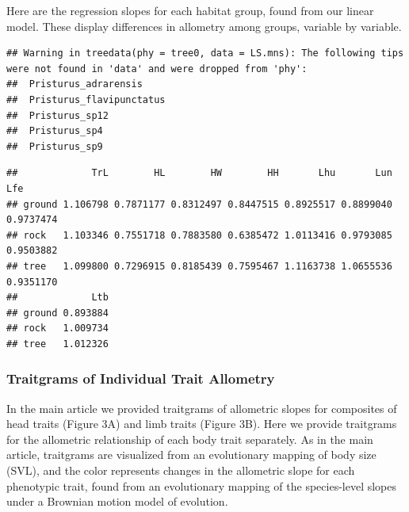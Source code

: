 \documentclass[
  11pt,
]{article}
\newenvironment{Shaded}{\begin{snugshade}}{\end{snugshade}}
\newcommand{\AttributeTok}[1]{\textcolor[rgb]{0.77,0.63,0.00}{#1}}
\newcommand{\CommentTok}[1]{\textcolor[rgb]{0.56,0.35,0.01}{\textit{#1}}}
\newcommand{\DecValTok}[1]{\textcolor[rgb]{0.00,0.00,0.81}{#1}}
\newcommand{\FunctionTok}[1]{\textcolor[rgb]{0.00,0.00,0.00}{#1}}
\newcommand{\NormalTok}[1]{#1}
\newcommand{\OtherTok}[1]{\textcolor[rgb]{0.56,0.35,0.01}{#1}}
\newcommand{\SpecialCharTok}[1]{\textcolor[rgb]{0.00,0.00,0.00}{#1}}
\begin{document}
Here are the regression slopes for each habitat group, found from our
linear model. These display differences in allometry among groups,
variable by variable.

\begin{verbatim}
## Warning in treedata(phy = tree0, data = LS.mns): The following tips were not found in 'data' and were dropped from 'phy':
##  Pristurus_adrarensis
##  Pristurus_flavipunctatus
##  Pristurus_sp12
##  Pristurus_sp4
##  Pristurus_sp9
\end{verbatim}

\begin{Shaded}
\end{Shaded}

\begin{verbatim}
##             TrL        HL        HW        HH       Lhu       Lun       Lfe
## ground 1.106798 0.7871177 0.8312497 0.8447515 0.8925517 0.8899040 0.9737474
## rock   1.103346 0.7551718 0.7883580 0.6385472 1.0113416 0.9793085 0.9503882
## tree   1.099800 0.7296915 0.8185439 0.7595467 1.1163738 1.0655536 0.9351170
##             Ltb
## ground 0.893884
## rock   1.009734
## tree   1.012326
\end{verbatim}

\newpage

\hypertarget{traitgrams-of-individual-trait-allometry}{%
\subsubsection{Traitgrams of Individual Trait
Allometry}\label{traitgrams-of-individual-trait-allometry}}

In the main article we provided traitgrams of allometric slopes for
composites of head traits (Figure 3A) and limb traits (Figure 3B). Here
we provide traitgrams for the allometric relationship of each body trait
separately. As in the main article, traitgrams are visualized from an
evolutionary mapping of body size (SVL), and the color represents
changes in the allometric slope for each phenotypic trait, found from an
evolutionary mapping of the species-level slopes under a Brownian motion
model of evolution.
\end{document}
